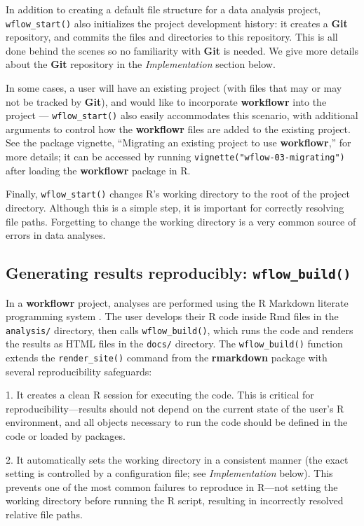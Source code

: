 \documentclass[9pt,a4paper]{extarticle}
\begin{document}
In addition to creating a default file structure for a data analysis
project, \texttt{wflow\_start()} also initializes the project development history:
it creates a \textbf{Git} repository, and commits the files and directories to
this repository. This is all done behind the scenes so no familiarity
with \textbf{Git} is needed. We give more details about the \textbf{Git} repository in the
\textit{Implementation} section below.

In some cases, a user will have an existing project (with files that may
or may not be tracked by \textbf{Git}), and would like to incorporate \textbf{workflowr}
into the project --- \texttt{wflow\_start()} also easily accommodates this
scenario, with additional arguments to control how the \textbf{workflowr} files
are added to the existing project. See the package vignette, ``Migrating
an existing project to use \textbf{workflowr},'' for more details; it can be
accessed by running \texttt{vignette("wflow-03-migrating")} after
loading the \textbf{workflowr} package in R.

Finally, \texttt{wflow\_start()} changes R’s working directory to the root of the
project directory. Although this is a simple step, it is important for
correctly resolving file paths. Forgetting to change the working
directory is a very common source of errors in data analyses.

\subsection*{Generating results reproducibly: \texttt{wflow\_build()}}

In a \textbf{workflowr} project, analyses are performed using the R Markdown
literate programming system \cite{Xie2018}. The user develops their R
code inside Rmd files in the \texttt{analysis/} directory, then calls
\texttt{wflow\_build()}, which runs the code and renders the results as HTML files
in the \texttt{docs/} directory. The \texttt{wflow\_build()} function extends the
\texttt{render\_site()} command from the \textbf{rmarkdown} package with several
reproducibility safeguards:

1. It creates a clean R session for executing the code. This is critical
for reproducibility—results should not depend on the current state of
the user's R environment, and all objects necessary to run the code
should be defined in the code or loaded by packages.

2. It automatically sets the working directory in a consistent manner
(the exact setting is controlled by a configuration file; see
\textit{Implementation} below). This prevents one of the most common
failures to reproduce in R—not setting the working directory before
running the R script, resulting in incorrectly resolved relative file
paths.
\end{document}

